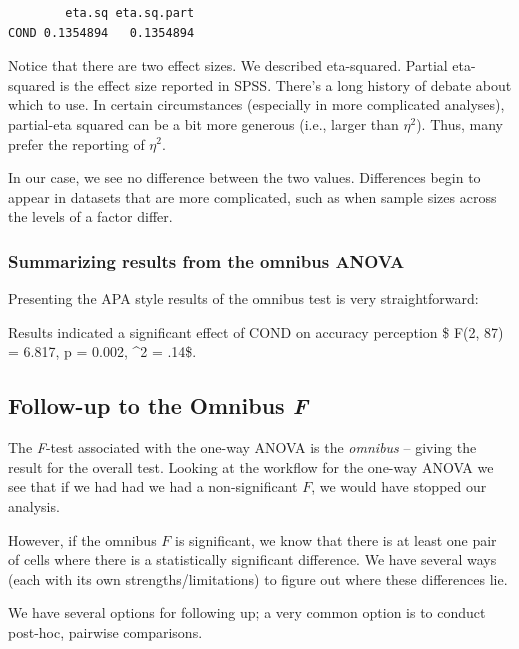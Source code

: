 \documentclass[
  english,
]{book}
\begin{document}
\begin{verbatim}
        eta.sq eta.sq.part
COND 0.1354894   0.1354894
\end{verbatim}

Notice that there are two effect sizes. We described eta-squared. Partial eta-squared is the effect size reported in SPSS. There's a long history of debate about which to use. In certain circumstances (especially in more complicated analyses), partial-eta squared can be a bit more generous (i.e., larger than \(\eta^2\)). Thus, many prefer the reporting of \(\eta^2\).

In our case, we see no difference between the two values. Differences begin to appear in datasets that are more complicated, such as when sample sizes across the levels of a factor differ.

\hypertarget{summarizing-results-from-the-omnibus-anova}{%
\subsubsection{Summarizing results from the omnibus ANOVA}\label{summarizing-results-from-the-omnibus-anova}}

Presenting the APA style results of the omnibus test is very straightforward:

Results indicated a significant effect of COND on accuracy perception \$ F(2, 87) = 6.817, p = 0.002, \eta\^{}2 = .14\$.

\hypertarget{follow-up-to-the-omnibus-f}{%
\subsection{\texorpdfstring{Follow-up to the Omnibus \emph{F}}{Follow-up to the Omnibus F}}\label{follow-up-to-the-omnibus-f}}

The \emph{F}-test associated with the one-way ANOVA is the \emph{omnibus} -- giving the result for the overall test. Looking at the workflow for the one-way ANOVA we see that if we had had we had a non-significant \(F\), we would have stopped our analysis.

However, if the omnibus \(F\) is significant, we know that there is at least one pair of cells where there is a statistically significant difference. We have several ways (each with its own strengths/limitations) to figure out where these differences lie.

We have several options for following up; a very common option is to conduct post-hoc, pairwise comparisons.
\end{document}
